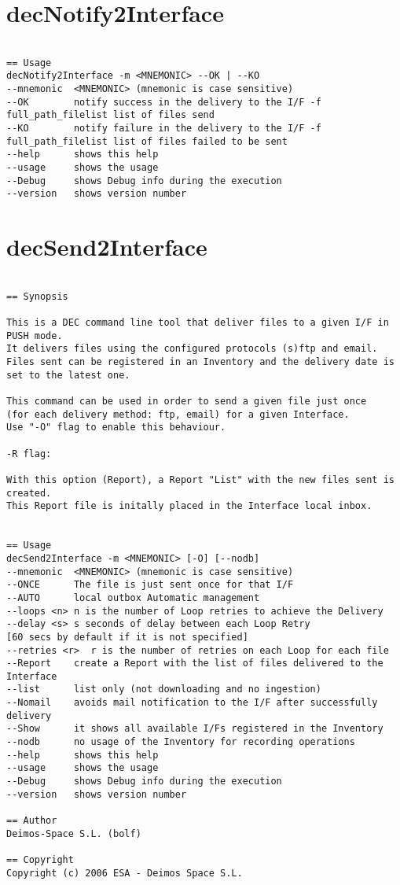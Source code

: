 \documentclass[dec_sum_main.tex]{subfiles}
\begin{document}
\section{decNotify2Interface}

\begin{verbatim}

== Usage
decNotify2Interface -m <MNEMONIC> --OK | --KO
--mnemonic  <MNEMONIC> (mnemonic is case sensitive)
--OK        notify success in the delivery to the I/F -f full_path_filelist list of files send
--KO        notify failure in the delivery to the I/F -f full_path_filelist list of files failed to be sent
--help      shows this help
--usage     shows the usage
--Debug     shows Debug info during the execution
--version   shows version number

\end{verbatim}

\section{decSend2Interface}

\begin{verbatim}

== Synopsis

This is a DEC command line tool that deliver files to a given I/F in PUSH mode.
It delivers files using the configured protocols (s)ftp and email. 
Files sent can be registered in an Inventory and the delivery date is set to the latest one.

This command can be used in order to send a given file just once 
(for each delivery method: ftp, email) for a given Interface. 
Use "-O" flag to enable this behaviour.

-R flag:

With this option (Report), a Report "List" with the new files sent is created. 
This Report file is initally placed in the Interface local inbox.


== Usage
decSend2Interface -m <MNEMONIC> [-O] [--nodb]
--mnemonic  <MNEMONIC> (mnemonic is case sensitive)
--ONCE      The file is just sent once for that I/F
--AUTO      local outbox Automatic management 
--loops <n> n is the number of Loop retries to achieve the Delivery
--delay <s> s seconds of delay between each Loop Retry
[60 secs by default if it is not specified]
--retries <r>  r is the number of retries on each Loop for each file
--Report    create a Report with the list of files delivered to the Interface
--list      list only (not downloading and no ingestion)
--Nomail    avoids mail notification to the I/F after successfully delivery
--Show      it shows all available I/Fs registered in the Inventory
--nodb      no usage of the Inventory for recording operations
--help      shows this help
--usage     shows the usage
--Debug     shows Debug info during the execution
--version   shows version number

== Author
Deimos-Space S.L. (bolf)

== Copyright
Copyright (c) 2006 ESA - Deimos Space S.L.


\end{verbatim}
\end{document}
